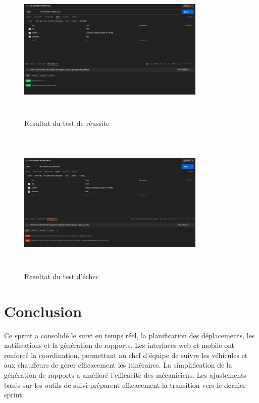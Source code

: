 \begin{figure}[h!]
    \centering
    \includegraphics[width=0.8\textwidth, height=7cm]{chap5.images/succes sprint 3.png}
    \caption{ Resultat du test de réussite}

\end{figure}

\begin{figure}[h!]
    \centering
    \includegraphics[width=0.8\textwidth, height=7cm]{chap5.images/fail sprint 3.png}
    \caption{ Resultat du test d'échec }

\end{figure}
\newpage
\section*{Conclusion}
\bigskip
\begin{sloppypar}
    Ce sprint a consolidé le suivi en temps réel, la planification des déplacements, les notifications et la génération de rapports. Les interfaces web et mobile ont renforcé la coordination, permettant au chef d'équipe de suivre les véhicules et aux chauffeurs de gérer efficacement les itinéraires. La simplification de la génération de rapports a amélioré l'efficacité des mécaniciens. Les ajustements basés sur les outils de suivi préparent efficacement la transition vers le dernier sprint.
\end{sloppypar}




